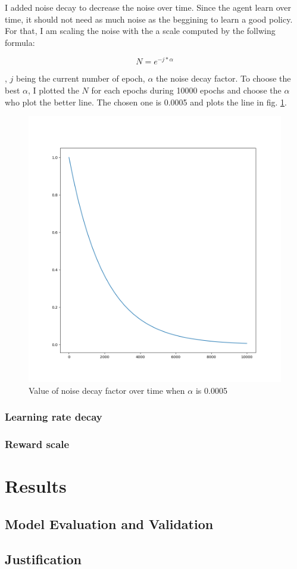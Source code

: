 \documentclass{article}
\begin{document}
I added noise decay to decrease the noise over time. Since the agent learn over
time, it should not need as much noise as the beggining to learn a good policy.
For that, I am scaling the noise with the a scale computed by the follwing
formula:

\begin{equation}
N = e^{-j * \alpha}
\end{equation}

, $j$ being the current number of epoch, $\alpha$ the noise decay factor. To
choose the best $\alpha$, I plotted the $N$ for each epochs during
10000 epochs and choose the $\alpha$ who plot the better line. The chosen one is
0.0005 and plots the line in fig. \ref{fig:noise_decay_factor}.

\begin{figure}[ht]
  \centering
  \includegraphics[width=.3\textwidth]{noise_decay_function}
  \caption{Value of noise decay factor over time when $\alpha$ is 0.0005}
  \label{fig:noise_decay_factor}
\end{figure}

\subsubsection{Learning rate decay}

\subsubsection{Reward scale}

\newpage
\section{Results}

\subsection{Model Evaluation and Validation}



\subsection{Justification}
\end{document}
